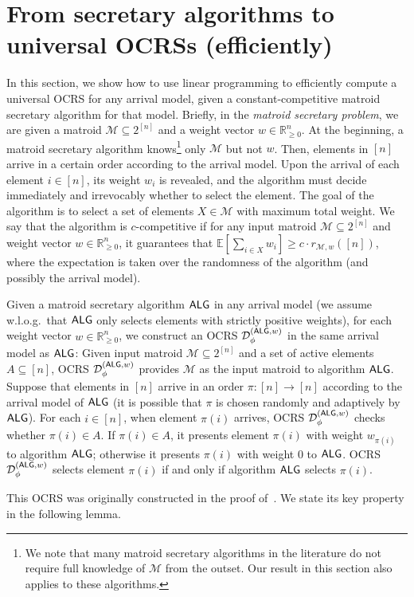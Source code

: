\documentclass[11pt]{article}
\newcommand{\D}{\mathcal D}
\def \E {\mathbb{E}}
\newcommand{\M}{{\mathcal M}}
\newcommand{\alg}{\textnormal{\sffamily ALG}}
\newcommand{\R}{{\mathbb R}}
\begin{document}
\section{From secretary algorithms to universal OCRSs (efficiently)}\label{sec:secretary_to_ocrs}
In this section, we show how to use linear programming to efficiently compute a universal OCRS for any arrival model, given a constant-competitive matroid secretary algorithm for that model. Briefly, in the \emph{matroid secretary problem}, we are given a matroid $\M\subseteq2^{[n]}$ and a weight vector $w\in\R_{\ge0}^{n}$. At the beginning, a matroid secretary algorithm knows\footnote{We note that many matroid secretary algorithms in the literature do not require full knowledge of $\M$ from the outset. Our result in this section also applies to these algorithms.} only $\M$ but not $w$. Then, elements in $[n]$ arrive in a certain order according to the arrival model. Upon the arrival of each element $i\in[n]$, its weight $w_i$ is revealed, and the algorithm must decide immediately and irrevocably whether to select the element. The goal of the algorithm is to select a set of elements $X\in\M$ with maximum total weight. We say that the algorithm is $c$-competitive if for any input matroid $\M\subseteq2^{[n]}$ and weight vector $w\in\R_{\ge0}^{n}$, it guarantees that $\E[\sum_{i\in X}w_i]\ge c\cdot r_{\M,w}([n])$, where the expectation is taken over the randomness of the algorithm (and possibly the arrival model).

Given a matroid secretary algorithm $\alg$ in any arrival model (we assume w.l.o.g.~that $\alg$ only selects elements with strictly positive weights), for each weight vector $w\in\R_{\ge0}^{n}$, we construct an OCRS $\D_{\phi}^{(\alg,w)}$ in the same arrival model as $\alg$: Given input matroid $\M\subseteq2^{[n]}$ and a set of active elements $A\subseteq[n]$, OCRS $\D_{\phi}^{(\alg,w)}$ provides $\M$ as the input matroid to algorithm $\alg$. Suppose that elements in $[n]$ arrive in an order $\pi:[n]\to[n]$ according to the arrival model of $\alg$ (it is possible that $\pi$ is chosen randomly and adaptively by $\alg$). For each $i\in[n]$, when element $\pi(i)$ arrives, OCRS $\D_{\phi}^{(\alg,w)}$ checks whether $\pi(i)\in A$. If $\pi(i)\in A$, it presents element $\pi(i)$ with weight $w_{\pi(i)}$ to algorithm $\alg$; otherwise it presents $\pi(i)$ with weight $0$ to $\alg$. OCRS $\D_{\phi}^{(\alg,w)}$ selects element $\pi(i)$ if and only if algorithm $\alg$ selects $\pi(i)$.

This OCRS was originally constructed in the proof of~\citet[Theorem 4.1]{dughmi2020outer}. We state its key property in the following lemma.
\end{document}
